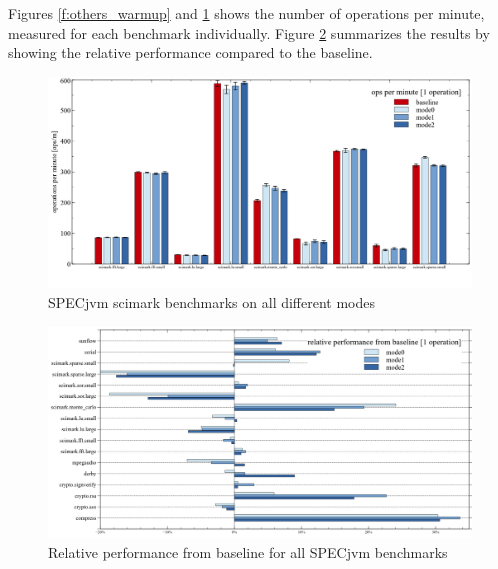 Figures \ref{f:others_warmup} and \ref{f:scimark_warmup} shows the number of operations per minute, measured for each benchmark individually.
Figure \ref{f:all_warmup_variation} summarizes the results by showing the relative performance compared to the baseline. 

\begin{figure}[ht]
  \begin{center}
    \centering
    \includegraphics[width=1.0\textwidth]{figures/scimark_warmup.png}
    \caption{SPECjvm scimark benchmarks on all different modes}
    \label{f:scimark_warmup}
  \end{center}
\end{figure}

\begin{figure}[ht]
  \begin{center}
    \centering
    \includegraphics[width=1.0\textwidth]{figures/all_warmup_variation.png}
    \caption{Relative performance from baseline for all SPECjvm benchmarks}
    \label{f:all_warmup_variation}
  \end{center}
\end{figure}

